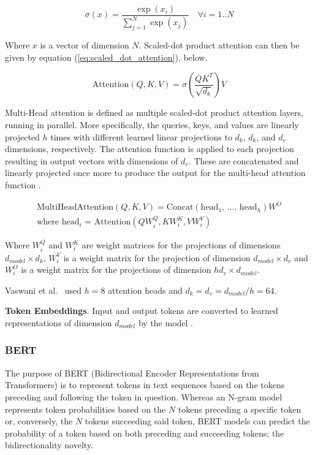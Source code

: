 \documentclass[12pt]{article}
\begin{document}
\begin{equation}\label{eq:softmax}
    \sigma(x) = \frac{\exp(x_i)}{\sum_{j=1}^{N}\exp(x_j)} \quad \forall i=1..N
\end{equation}

\noindent
Where $x$ is a vector of dimension $N$. Scaled-dot product attention can then be given by equation (\ref{eq:scaled_dot_attention}), below.

\begin{equation}\label{eq:scaled_dot_attention}
    \mbox{Attention}(Q,K,V) = \sigma\left(\frac{QK^T}{\sqrt{d_k}}\right)V
\end{equation}

Multi-Head attention is defined as multiple scaled-dot product attention layers, running in parallel. More specifically, the queries, keys, and values
are linearly projected $h$ times with different learned linear projections to $d_k$, $d_k$, and $d_v$ dimensions, respectively. The attention function
is applied to each projection resulting in output vectors with dimensions of $d_v$. These are concatenated and linearly projected once more to produce
the output for the multi-head attention function \cite{vaswani_attention_2017}.

\begin{equation}\label{eq:multi_head_attention}
    \begin{gathered}
        \mbox{MultiHeadAttention}(Q,K,V) = \mbox{Concat}(\mbox{head$_1$, ..., head$_h$})W^O\\
        \mbox{where head$_i$ = Attention}(QW_i^Q, KW_i^K, VW_i^V)
    \end{gathered}
\end{equation}

\noindent
Where $W_i^Q$ and $W_i^K$ are weight matrices for the projections of dimensions $d_{model} \times d_k$, $W_i^V$ is a weight matrix for the projection
of dimension $d_{model} \times d_v$ and $W_i^O$ is a weight matrix for the projections of dimension $h d_v \times d_{model}$.

Vaswani et al.~\cite{vaswani_attention_2017} used $h = 8$ attention heads and $d_k = d_v = d_{model} / h = 64$.

\textbf{Token Embeddings}. Input and output tokens are converted to learned representations of dimension $d_{model}$ by the model
\cite{vaswani_attention_2017}.

\subsubsection{BERT}\label{sec:bert}
The purpose of BERT (Bidirectional Encoder Representations from Transformers) is to represent tokens in text sequences based on the tokens preceding
and following the token in question. Whereas an N-gram model represents token probabilities based on the $N$ tokens preceding a specific token or,
conversely, the $N$ tokens succeeding said token, BERT models can predict the probability of a token based on both preceding and succeeding tokens;
the bidirectionality novelty.
\end{document}
